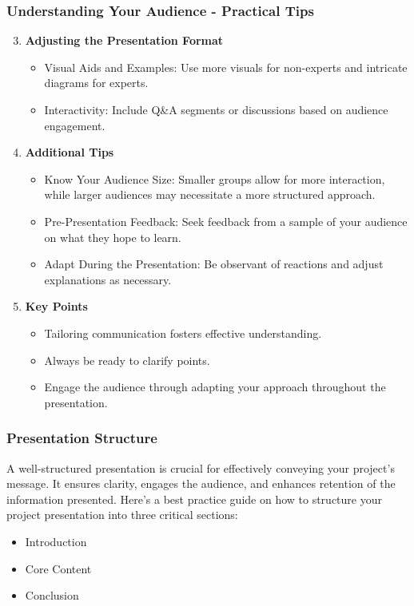 \documentclass{beamer}
\begin{document}
\begin{frame}[fragile]
    \frametitle{Understanding Your Audience - Practical Tips}
    \begin{enumerate}
        \setcounter{enumi}{2}
        \item \textbf{Adjusting the Presentation Format}
        \begin{itemize}
            \item Visual Aids and Examples: Use more visuals for non-experts and intricate diagrams for experts.
            \item Interactivity: Include Q\&A segments or discussions based on audience engagement.
        \end{itemize}

        \item \textbf{Additional Tips}
        \begin{itemize}
            \item Know Your Audience Size: Smaller groups allow for more interaction, while larger audiences may necessitate a more structured approach.
            \item Pre-Presentation Feedback: Seek feedback from a sample of your audience on what they hope to learn.
            \item Adapt During the Presentation: Be observant of reactions and adjust explanations as necessary.
        \end{itemize}
        
        \item \textbf{Key Points}
        \begin{itemize}
            \item Tailoring communication fosters effective understanding.
            \item Always be ready to clarify points.
            \item Engage the audience through adapting your approach throughout the presentation.
        \end{itemize}
    \end{enumerate}
\end{frame}

\begin{frame}[fragile]
    \frametitle{Presentation Structure}
    A well-structured presentation is crucial for effectively conveying your project’s message. 
    It ensures clarity, engages the audience, and enhances retention of the information presented. 
    Here's a best practice guide on how to structure your project presentation into three critical sections:
    \begin{itemize}
        \item Introduction
        \item Core Content
        \item Conclusion
    \end{itemize}
\end{frame}
\end{document}
